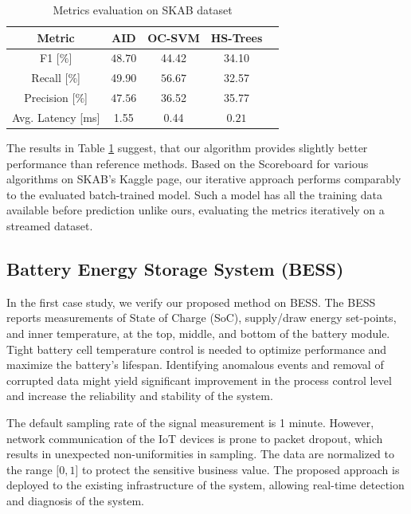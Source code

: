 \begin{table}[htbp]
 \caption{Metrics evaluation on SKAB dataset}
 \begin{center}
 \label{tab:perf_comp}
 \begin{tabular}{|c|c|c|c|c|}
 \hline
 Metric & AID & OC-SVM & HS-Trees \\
 \hline
 F1 [$\%$] & $\boldsymbol{48.70}$ & 44.42 & 34.10 \\
 \hline
 Recall [$\%$] & 49.90 & $\boldsymbol{56.67}$ & 32.57 \\
 \hline
 Precision [$\%$] & $\boldsymbol{47.56}$ & 36.52 & 35.77 \\
 \hline
 Avg. Latency [ms] & 1.55 & 0.44 & $\boldsymbol{0.21}$ \\
 \hline
 \end{tabular}
 \end{center}
\end{table}

The results in Table \ref{tab:perf_comp} suggest, that our algorithm provides slightly better performance than reference methods. Based on the Scoreboard for various algorithms on SKAB's Kaggle page, our iterative approach performs comparably to the evaluated batch-trained model. Such a model has all the training data available before prediction unlike ours, evaluating the metrics iteratively on a streamed dataset.

\subsection{Battery Energy Storage System (BESS)}\label{AA:BESS}
In the first case study, we verify our proposed method on BESS. The BESS reports measurements of State of Charge (SoC), supply/draw energy set-points, and inner temperature, at the top, middle, and bottom of the battery module. Tight battery cell temperature control is needed to optimize performance and maximize the battery's lifespan. Identifying anomalous events and removal of corrupted data might yield significant improvement in the process control level and increase the reliability and stability of the system.

The default sampling rate of the signal measurement is 1 minute. However, network communication of the IoT devices is prone to packet dropout, which results in unexpected non-uniformities in sampling. The data are normalized to the range $[0, 1$] to protect the sensitive business value. The proposed approach is deployed to the existing infrastructure of the system, allowing real-time detection and diagnosis of the system.

